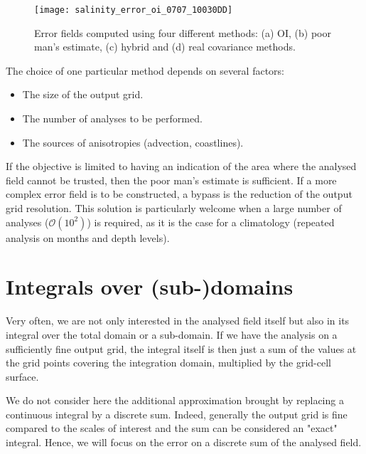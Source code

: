 \begin{figure*}[htpb]
\centering
\texttt{[image: salinity\_error\_oi\_0707\_10030DD]}
\caption[Error fields computed using four different methods.]{Error fields computed using four different methods: (a) OI, (b) poor man's estimate, (c) hybrid and (d) real covariance methods.\label{fig:salinity_error_oi_0707_10030DD}}
\end{figure*}

The choice of one particular method depends on several factors:
\begin{itemize}
\item The size of the output grid.
\item The number of analyses to be performed.
\item The sources of anisotropies (advection, coastlines).
\end{itemize} 

If the objective is limited to having an indication of the area where the analysed field cannot be trusted, then the poor man's estimate is sufficient. If a more complex error field is to be constructed, a bypass is the reduction of the output grid resolution. This solution is particularly welcome when a large number of analyses ($\mathcal{O}(10^{2})$) is required, as it is the case for a climatology (repeated analysis on months and depth levels).





\clearpage

\section{Integrals over (sub-)domains}

Very often, we are not only interested in the analysed field itself but also in its integral over the
total domain or a sub-domain. If we have the analysis on a sufficiently fine output grid, the integral
itself is then just a sum of the values at the grid points covering the integration domain, multiplied by the
grid-cell surface. 

We do not consider here the additional approximation brought by replacing a continuous integral by
a discrete sum. Indeed, generally the output grid is fine compared to the scales of interest
and the sum can be considered an "exact" integral. Hence, we will focus on the error on a discrete sum of the analysed field.

